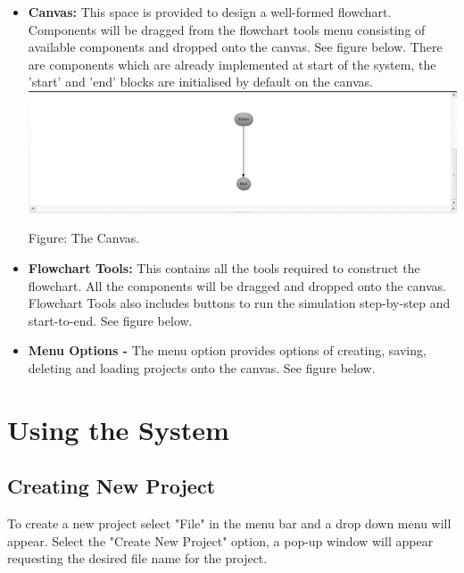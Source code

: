 \documentclass[11pt,a4paper,titlepage]{article}
\begin{document}
		
		\begin{itemize}
			\item \textbf{Canvas:} This space is provided to design a 			well-formed flowchart. Components will be dragged from the flowchart 				tools menu consisting of available components and dropped onto the 				canvas. See figure below.\newline
			There are components which are already implemented at start of the system, the 'start' and 'end' blocks are initialised by default on the canvas.\newline \newline
			\includegraphics[width=\textwidth]{Canvas.jpg}
			\begin{center}
		Figure: The Canvas.
		\end{center}
			
			\item \textbf{Flowchart Tools:} This contains all the tools 				required to construct the flowchart. All the components will be 			dragged and dropped onto the canvas. Flowchart Tools also includes 				buttons to run the simulation step-by-step and start-to-end. See figure below.
			
			\item \textbf{Menu Options -} The menu option provides options of 				creating, saving, deleting and loading projects onto the canvas. See figure below.
			
		\end{itemize}

	\newpage
\section{Using the System}
	\subsection{Creating New Project}
	
		To create a new project select "File" in the menu bar and a drop down menu will appear. Select the "Create New Project" option, a pop-up window will appear requesting the desired file name for the project.
		
\end{document}
